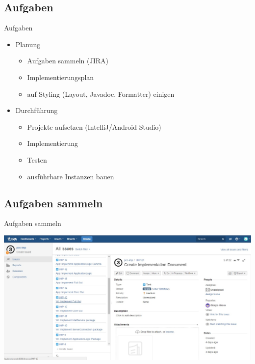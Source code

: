 \documentclass[19pt]{beamer}
\begin{document}
\subsection{Aufgaben}
\begin{frame}{Aufgaben}
	\begin{itemize}
		\item Planung
		\pause
		\begin{itemize}
			\item Aufgaben sammeln (JIRA)
			\pause
			\item Implementierungsplan
			\pause
			\item auf Styling (Layout, Javadoc, Formatter) einigen
			\pause
		\end{itemize}
		\item Durchführung
		\pause
		\begin{itemize}
			\item Projekte aufsetzen (IntelliJ/Android Studio)
			\pause
			\item Implementierung
			\pause
			\item Testen
			\pause
			\item ausführbare Instanzen bauen
		\end{itemize}
	\end{itemize}
\end{frame}

\subsection{Aufgaben sammeln}

\begin{frame}{Aufgaben sammeln}
	\begin{center}
		\includegraphics[scale=0.3]{resources/Jira.jpg}
	\end{center}
\end{frame}
\end{document}
